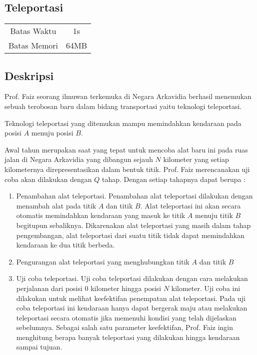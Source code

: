 \documentclass{article}
\begin{document}
\begin{center}
    \section*{Teleportasi} %

    \begin{tabular}{ | c c | }
        \hline
        Batas Waktu  & 1s \\    %
        Batas Memori & 64MB \\  %
        \hline
    \end{tabular}
\end{center}

\subsection*{Deskripsi}

Prof. Faiz seorang ilmuwan terkemuka di Negara Arkavidia berhasil menemukan sebuah terobosan baru dalam bidang transportasi yaitu teknologi teleportasi.

Teknologi teleportasi yang ditemukan mampu memindahkan kendaraan pada posisi $A$ menuju posisi $B$.

Awal tahun merupakan saat yang tepat untuk mencoba alat baru ini pada ruas jalan di Negara Arkavidia yang dibangun sejauh $N$ kilometer yang setiap kilometernya direpresentasikan dalam bentuk titik. Prof. Faiz merencanakan uji coba akan dilakukan dengan $Q$ tahap. Dengan setiap tahapnya dapat berupa :

\begin{enumerate}
    \setlength\itemsep{0pt}
    \item  Penambahan alat teleportasi. Penambahan alat teleportasi dilakukan dengan menambah alat pada titik $A$ dan titik $B$. Alat teleportasi ini akan secara otomatis memindahkan kendaraan yang masuk ke titik $A$ menuju titik $B$ begitupun sebaliknya. Dikarenakan alat teleportasi yang masih dalam tahap pengembangan, alat teleportasi dari suatu titik tidak dapat memindahkan kendaraan ke dua titik berbeda.

    \item Pengurangan alat teleportasi yang menghubungkan titik $A$ dan titik $B$

    \item Uji coba teleportasi. Uji coba teleportasi dilakukan dengan cara melakukan perjalanan dari posisi $0$ kilometer hingga posisi $N$ kilometer. Uji coba ini dilakukan untuk melihat keefektifan penempatan alat teleportasi. Pada uji coba teleportasi ini kendaraan hanya dapat bergerak maju atau melakukan teleportasi secara otomatis jika memenuhi kondisi yang telah dijelaskan sebelumnya. Sebagai salah satu parameter keefektifan, Prof. Faiz ingin menghitung berapa banyak teleportasi yang dilakukan hingga kendaraan sampai tujuan.   
\end{enumerate}
\end{document}
